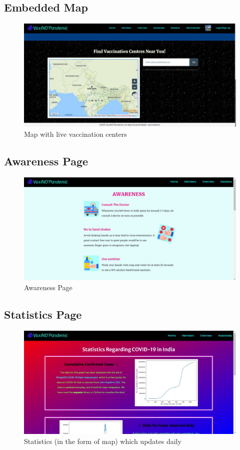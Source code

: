 \documentclass{article}
\begin{document}
    \subsection{Embedded Map}
        \begin{figure}[hbt]
            \centering
            \includegraphics[scale=0.3]{maparea.jpeg}
            \caption{Map with live vaccination centers}
            \label{fig:maparea}
        \end{figure}
    \subsection{Awareness Page}
        \begin{figure}[hbt]
            \centering
            \includegraphics[scale=0.3]{awareness.jpeg}
            \caption{Awareness Page}
            \label{fig:awareness}
        \end{figure}
    \newpage
    \subsection{Statistics Page}
        \begin{figure}[hbt]
            \centering
            \includegraphics[scale=0.3]{stats.jpeg}
            \caption{Statistics (in the form of map) which updates daily}
            \label{fig:stats}
        \end{figure}
\end{document}
